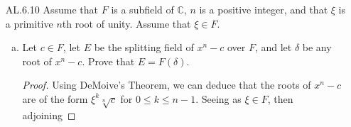 \documentclass[12pt]{article}
\begin{document}
\begin{enumerate}
\begin{enumerate}[(a)]
\begin{proof}
\begin{align*}
\begin{cases}
                                \sqrt[3]{2}&\mapsto\sqrt[3]{2} \\
                                \omega&\mapsto\omega^2.
                            \end{cases}
                        \end{align*}
                        With these in hand, we see the following
                        correspondances with the index permutations:
                        \begin{align*}
                            \sigma_1:(1) & &\sigma_2:(123) & &\sigma_3:(132) \\
                            \sigma_4:(23) & &\sigma_5:(12) & &\sigma_6:(13).
                        \end{align*}
                    \end{proof}
                \item For $H=\langle(123)\rangle$, find the subfield of $L$
                    that corresponds to $H$ as given by the Fundamental Theorem
                    of Galois Theory. 
                    \begin{proof}
                        By part (b), we see that $H=\langle(123)\rangle$
                        corresponds to the following automorphisms $\{\sigma_1,
                        \sigma_2, \sigma_3\}$. By the definitions of each of
                        these mappings, we see that each one of them fix
                        $\omega$ and only fix $\omega$. Therefore the
                        corresponding fixed field is $\mathbb{Q}(\omega)$.   
                    \end{proof}
            \end{enumerate}
        \item[AL.6.10] Assume that $F$ is a subfield of $\mathbb{C}$, $n$ is
            a positive integer, and that $\xi$ is a primitive $n$th root of
            unity. Assume that $\xi\in F$. 
            \begin{enumerate}[(a)]
                \item Let $c\in F$, let $E$ be the splitting field of $x^n-c$
                    over $F$, and let $\delta$ be any root of $x^n-c$. Prove
                    that $E=F(\delta)$. 
                    \begin{proof}
                        Using DeMoive's Theorem, we can deduce that the roots
                        of $x^n-c$ are of the form $\xi^k\sqrt[n]{c}$ for
                        $0\leq k\leq n-1$. Seeing as $\xi\in F$, then adjoining

\end{proof}
\end{enumerate}
\end{enumerate}
\end{document}
